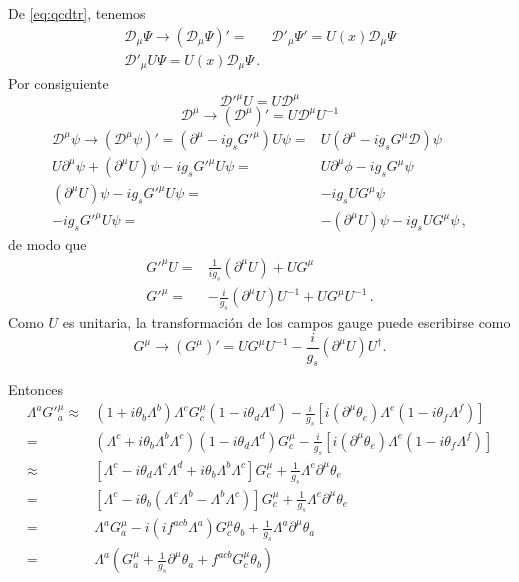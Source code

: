 De \eqref{eq:qcdtr}, tenemos
\begin{align}
   \mathcal{D}_\mu\Psi\to \left(\mathcal{D}_\mu\Psi\right)'=&\mathcal{D}'_\mu\Psi'
  =U(x)\mathcal{D}_\mu\Psi\nonumber\\
\mathcal{D}'_\mu U\Psi
  =U(x)\mathcal{D}_\mu\Psi\,.
\end{align}
Por consiguiente
\begin{equation}
  {\mathcal{D}'}^\mu U=U\mathcal{D}^\mu
\end{equation}
\begin{equation}
  \mathcal{D}^\mu\to\left(
    \mathcal{D}^\mu
  \right)'=U\mathcal{D}^\mu U^{-1}
\end{equation}
\begin{align}
  \label{eq:251qft}
   {\mathcal{D}}^\mu\psi\to{\left({\mathcal{D}}^\mu\psi\right)}'=
  (\partial^\mu-i g_s {G'}^\mu) U\psi=&U(\partial^\mu-i g_s {G}^\mu\mathcal{D})\psi\nonumber\\
  U\partial^\mu\psi+(\partial^\mu U)\psi-i g_s {G'}^\mu U \psi=&U\partial^\mu\phi-i g_s {G}^\mu \psi\nonumber\\
  (\partial^\mu U)\psi-i g_s {G'}^\mu U \psi=&-i g_s U {G}^\mu \psi\nonumber\\
  -i g_s {G'}^\mu U \psi=&-(\partial^\mu U)\psi-i g_s U {G}^\mu \psi\,,
\end{align}
de modo que
\begin{align}
     {G'}^\mu U =&\frac{1}{i g_s}(\partial^\mu U)+ U{G}^\mu \nonumber\\
   {G'}^\mu  =&-\frac{i}{g_s}(\partial^\mu U)U^{-1}+ U{G}^\mu U^{-1}\,.
\end{align}
Como $U$ es unitaria, la transformación de los campos gauge puede escribirse como
\begin{equation}
    {G}^\mu\to\left({G}^\mu\right)'=U{G}^\mu U^{-1}-\frac{i}{g_s}\left(\partial^\mu U\right)U^\dagger.
\end{equation}

Entonces
\begin{align}
\label{eq:Gmuinv}
  \Lambda^a{G'}^\mu_a\approx&(1+i\theta_b\Lambda^b)\Lambda^cG^\mu_c(1-i\theta_d\Lambda^d)-\frac{i}{g_s}[i(\partial^\mu\theta_e)\Lambda^e(1-i\theta_f\Lambda^f)]\nonumber\\
  =&(\Lambda^c+i\theta_b\Lambda^b\Lambda^c)(1-i\theta_d\Lambda^d)G^\mu_c-\frac{i}{g_s}[i(\partial^\mu\theta_e)\Lambda^e(1-i\theta_f\Lambda^f)]\nonumber\\
  \approx&[\Lambda^c-i\theta_d\Lambda^c\Lambda^d+i\theta_b\Lambda^b\Lambda^c]G^\mu_c+\frac{1}{g_s}\Lambda^e\partial^\mu\theta_e\nonumber\\
  =&[\Lambda^c-i\theta_b(\Lambda^c\Lambda^b-\Lambda^b\Lambda^c)]G^\mu_c+\frac{1}{g_s}\Lambda^e\partial^\mu\theta_e\nonumber\\
  =&\Lambda^aG^\mu_a-i(i f^{acb}\Lambda^a)G^\mu_c\theta_b+\frac{1}{g_s}\Lambda^a\partial^\mu\theta_a\nonumber\\
  =&\Lambda^a\left(G^\mu_a+\frac{1}{g_s}\partial^\mu\theta_a+f^{acb}G^\mu_c\theta_b\right)
\end{align}

